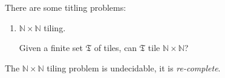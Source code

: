 \documentclass[a4paper,12pt,landscape]{article}
\begin{document}
\vspace{1.5em}


There are some titling problems:

\begin{enumerate}
    \item 
    $\mathbb{N} \times \mathbb{N}$ tiling. 

    Given a finite set $\mathfrak{T}$ of tiles, 
    can $\mathfrak{T}$ tile $\mathbb{N} \times \mathbb{N}$?
\end{enumerate}




    The $\mathbb{N} \times \mathbb{N}$ tiling problem is undecidable, 
    it is \textit{re-complete}.






\end{document}
